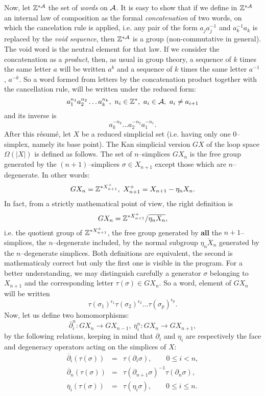 Now, let ${\mathbb{Z}}^{*{\cal A}}$ the set of {\em  words} on $\cal A$.
It is easy to show that if we define in ${\mathbb{Z}}^{*{\cal A}}$ an internal law of composition as the
formal {\em concatenation} of two words,
on which the cancelation rule is applied, i.e. any pair of the form
$a_ja_j^{-1}$ and $a_k^{-1}a_k$ is replaced by the {\em void sequence},
then ${\mathbb{Z}}^{*{\cal A}}$ is a group (non-commutative in general).
The void word is the neutral element for that law. If we consider
the concatenation as a  {\em product}, then, as usual in group theory,
a sequence of $k$ times the same letter $a$
will be written $a^k$ and a sequence of $k$ times the same letter $a^{-1}$,
$a^{-k}$. So a word
formed from letters by the  concatenation product together with the cancellation rule,
will be written under the reduced form:
$$a_1^{n_1}a_2^{n_2}\ldots a_k^{n_k},\ n_i\in {\mathbb{Z}}^*,\ a_i\in {\cal A},\  a_i \not= a_{i+1}$$
and its inverse is
$$a_k^{-n_k}\ldots a_2^{-n_2}a_1^{-n_1}.$$
After this r\'esum\'e, let $X$ be a reduced simplicial set (i.e. having only one $0$--simplex,
namely its base point). The Kan simplicial version $GX$
of the loop space $\Omega(|X|)$ is defined as follows.
The set of $n$--simplices $GX_n$ is the free group generated by the $(n+1)$--simplices
$\sigma \in X_{n+1}$ except those which are $n$--degenerate. In other words:
$$ GX_n=\Z^{*X^+_{n+1}},\ X^+_{n+1}=X_{n+1}-\eta_n X_n. $$
In fact, from a strictly mathematical point of view, the right definition is
$$ GX_n = {\mathbb{Z}}^{*X^+_{n+1}} / {\overline{\eta_n X_n}},$$
i.e. the quotient group of ${\mathbb{Z}}^{*X^+_{n+1}}$, the free group generated by {\bf all} the $n+1$--simplices,
the $n$--degenerate included, by  the normal subgroup ${\overline{\eta_n X_n}}$ generated by
the $n$--degenerate simplices. Both definitions are equivalent, the second is mathematicaly
correct but only the first one is visible in the program.
\vskip 0.35cm
For a better understanding, we may distinguish carefully a generator $\sigma$ belonging to  $X_{n+1}$ and
the corresponding letter  $\tau (\sigma) \in GX_n$. So a word, element
of $GX_n$ will be written
$${\tau(\sigma_1)}^{\epsilon_1} {\tau(\sigma_2)}^{\epsilon_2} \ldots {\tau(\sigma_p)}^{\epsilon_p}.$$
Now, let us define two homomorphisms:
$$ \overline{\partial}_i^n: GX_n \longrightarrow GX_{n-1},\ \overline{\eta}_i^n: GX_n \longrightarrow GX_{n+1},$$
by the following relations, keeping in mind that $\partial_i$ and $\eta_i$ are respectively the face
and degeneracy operators acting on the  simplices of  $X$:
\begin{eqnarray*}
\overline{\partial}_i(\tau(\sigma))  & = & \tau(\partial_i\sigma),\qquad 0 \leq i < n, \\
\overline{\partial}_n(\tau(\sigma))  & = & \tau(\partial_{n+1}\sigma)^{-1}\tau(\partial_n\sigma), \\
\overline{\eta}_i(\tau(\sigma))    & = & \tau(\eta_i\sigma),\qquad 0 \leq i \leq n.
\end{eqnarray*}
